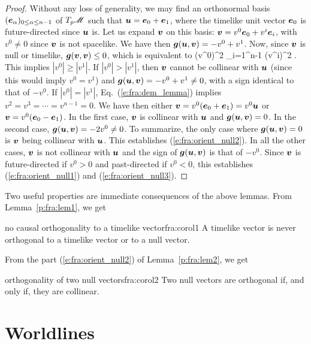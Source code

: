 \begin{proof}
Without any loss of generality,
we may find an orthonormal basis $(\bm{e}_\alpha)_{0\leq \alpha\leq n-1}$ of
$T_p\mathscr{M}$ such that $\bm{u} = \bm{e}_0 + \bm{e}_1$, where the timelike unit vector
$\bm{e}_0$ is future-directed since $\bm{u}$ is. Let us expand $\bm{v}$ on this
basis: $\bm{v} = v^0 \bm{e}_0 + v^i \bm{e}_i$, with $v^0 \not = 0$ since
$\bm{v}$ is not spacelike. We have then
$\bm{g}(\bm{u},\bm{v}) = -v^0 + v^1$. Now, since $\bm{v}$ is null or timelike,
$\bm{g}(\bm{v},\bm{v}) \leq 0$, which is equivalent to
\be \label{e:fra:dem_lemma}
    (v^0)^2 \geq \sum_{i=1}^{n-1} (v^i)^2 .
\ee
This implies $|v^0| \geq |v^1|$.
If $|v^0| > |v^1|$, then $\bm{v}$ cannot be collinear with $\bm{u}$
(since this would imply $v^0 = v^1$)
and
$\bm{g}(\bm{u},\bm{v}) = -v^0 + v^1 \neq 0$, with a sign identical to that of $-v^0$. If $|v^0| = |v^1|$, Eq.~(\ref{e:fra:dem_lemma})
implies $v^2=v^3=\cdots=v^{n-1} = 0$. We have then
either $\bm{v} = v^0 (\bm{e}_0 + \bm{e}_1) = v^0 \bm{u}$ or
$\bm{v} = v^0 (\bm{e}_0 - \bm{e}_1)$. In the first case, $\bm{v}$ is collinear with $\bm{u}$
and $\bm{g}(\bm{u},\bm{v})=0$. In
the second case, $\bm{g}(\bm{u},\bm{v}) = -2 v^0 \neq 0$. To summarize, the
only case where $\bm{g}(\bm{u},\bm{v})=0$ is $\bm{v}$ being collinear with $\bm{u}$.
This establishes (\ref{e:fra:orient_null2}).
In all the other cases, $\bm{v}$ is not collinear with $\bm{u}$ and the sign of $\bm{g}(\bm{u},\bm{v})$
is that of $-v^0$. Since
$\bm{v}$ is future-directed if $v^0 > 0$
and past-directed if $v^0 < 0$, this establishes (\ref{e:fra:orient_null1})
and (\ref{e:fra:orient_null3}).
\end{proof}

Two useful properties are immediate consequences of the above lemmas.
From Lem\-ma~\ref{p:fra:lem1}, we get

\begin{tprop}{no causal orthogonality to a timelike vector}{fra:corol1}
A timelike vector is never orthogonal to a timelike vector or to a null vector.
\end{tprop}

From the part (\ref{e:fra:orient_null2}) of Lemma~\ref{p:fra:lem2}, we get

\begin{tprop}{orthogonality of two null vectors}{fra:corol2}
Two null vectors are orthogonal if, and only if, they are collinear.
\end{tprop}


\section{Worldlines} \label{s:fra:worldlines}

